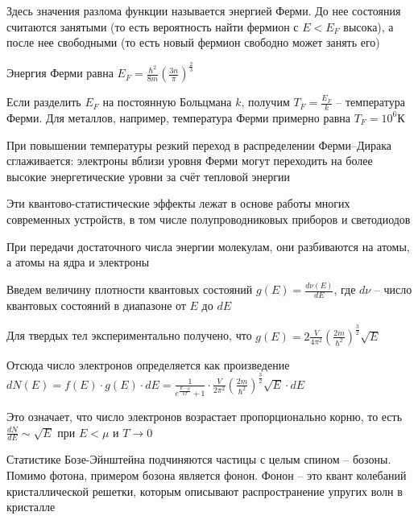\documentclass[12pt]{article}
\begin{document}
Здесь значения разлома функции называется энергией Ферми. До нее состояния считаются занятыми (то есть вероятность найти фермион с $E < E_F$ высока), а после нее свободными (то есть новый фермион свободно может занять его)

Энергия Ферми равна $E_F = \frac{\hbar^2}{8m} \left(\frac{3n}{\pi}\right)^{\frac{2}{3}}$

Если разделить $E_F$ на постоянную Больцмана $k$, получим $T_F = \frac{E_F}{k}$ -- температура Ферми. Для металлов, например, температура Ферми примерно равна $T_F = 10^6 \text{К}$

При повышении температуры резкий переход в распределении Ферми–Дирака сглаживается: электроны вблизи уровня Ферми могут переходить на более высокие энергетические уровни за счёт тепловой энергии

Эти квантово-статистические эффекты лежат в основе работы многих современных устройств, в том числе полупроводниковых приборов и светодиодов






\mediumvspace




При передачи достаточного числа энергии молекулам, они разбиваются на атомы, а атомы на ядра и электроны

Введем величину плотности квантовых состояний $g(E) = \frac{d \nu(E)}{dE}$, где $d\nu$ -- число квантовых состояний в диапазоне от $E$ до $dE$

Для твердых тел экспериментально получено, что $g(E) = 2 \frac{V}{4\pi^2} \left(\frac{2m}{\hbar^2}\right)^{\frac{3}{2}} \sqrt{E}$

Отсюда число электронов определяется как произведение $dN(E) = f(E) \cdot g(E) \cdot dE = \frac{1}{e^{\frac{E - \mu}{kT}} + 1} \cdot \frac{V}{2\pi^2} \left(\frac{2m}{\hbar^2}\right)^{\frac{3}{2}} \sqrt{E} \cdot dE$

Это означает, что число электронов возрастает пропорционально корню, то есть $\frac{dN}{dE} \sim \sqrt{E}$ при $E < \mu$ и $T \to 0$


Статистике Бозе-Эйнштейна подчиняются частицы с целым спином -- бозоны. Помимо фотона, примером бозона является фонон. Фонон -- это квант колебаний кристаллической решетки, которым описывают распространение упругих волн в кристалле
\end{document}
